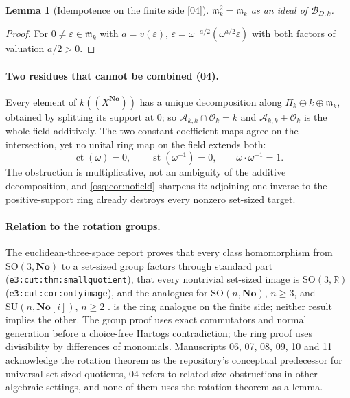\documentclass[11pt,letterpaper]{article}
\numberwithin{equation}{section}
\newtheorem{lemma}[lemma]{Lemma}
\theoremstyle{definition}
\theoremstyle{remark}
\theoremstyle{plain}
\newcommand{\No}{\mathbf{No}}
\newcommand{\SC}{\No[i]}
\newcommand{\R}{\mathbb R}
\newcommand{\A}{\mathcal A}          %
\newcommand{\B}{\mathcal B}          %
\newcommand{\mm}{\mathfrak m}        %
\newcommand{\OO}{\mathcal O}         %
\newcommand{\hahn}[2]{#1(\!(X^{#2})\!)}
\newcommand{\ct}{\operatorname{ct}}
\newcommand{\st}{\operatorname{st}}
\newcommand{\src}[1]{\textup{\textsf{[#1]}}}
\begin{document}
\begin{lemma}[Idempotence on the finite side \src{04}]\label{osq:lem:midempotent}
$\mm_k^2=\mm_k$ as an ideal of $\B_{D,k}$.
\end{lemma}
\begin{proof}
For $0\ne\varepsilon\in\mm_k$ with $a=v(\varepsilon)$,
$\varepsilon=\omega^{-a/2}(\omega^{a/2}\varepsilon)$ with both factors of valuation $a/2>0$.
\end{proof}

\paragraph{Two residues that cannot be combined (04).} Every element of $\hahn k\No$ has a
unique decomposition along $\Pi_k\oplus k\oplus\mm_k$, obtained by splitting its support at
$0$; so $\A_{k,k}\cap\OO_k=k$ and $\A_{k,k}+\OO_k$ is the whole field additively. The two
constant-coefficient maps agree on the intersection, yet no unital ring map on the field
extends both:
\begin{equation}\label{osq:eq:incompatible}
 \ct(\omega)=0,\qquad\st(\omega^{-1})=0,\qquad\omega\cdot\omega^{-1}=1 .
\end{equation}
The obstruction is multiplicative, not an ambiguity of the additive decomposition, and
\cref{osq:cor:nofield} sharpens it: adjoining one inverse to the positive-support ring
already destroys every nonzero set-sized target.

\paragraph{Relation to the rotation groups.} The euclidean-three-space report proves that
every class homomorphism from $\mathrm{SO}(3,\No)$ to a set-sized group factors through
standard part (\nolinkurl{e3:cut:thm:smallquotient}), that every nontrivial set-sized image is
$\mathrm{SO}(3,\R)$ (\nolinkurl{e3:cut:cor:onlyimage}), and the analogues for $\mathrm{SO}(n,\No)$, $n\ge3$,
and $\mathrm{SU}(n,\SC)$, $n\ge2$ \cite{RepoE3}.  is the ring analogue on the
finite side; neither result implies the other. The group proof uses exact commutators and
normal generation before a choice-free Hartogs contradiction; the ring proof uses
divisibility by differences of monomials. Manuscripts 06, 07, 08, 09, 10 and 11
acknowledge the rotation theorem as the repository's conceptual predecessor for universal
set-sized quotients, 04 refers to related size obstructions in other algebraic settings,
and none of them uses the rotation theorem as a lemma.
\end{document}
